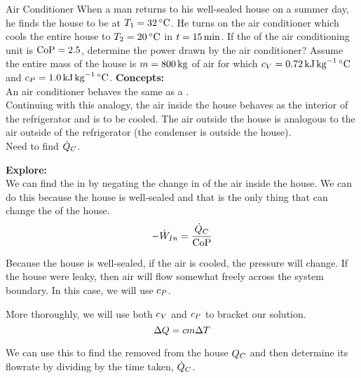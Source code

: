 \begin{example}{Air Conditioner}
  When a man returns to his well-sealed house on a summer day, he finds the house to be at $\Temp_{1} = \SI{32}{\degreeCelsius}$.
  He turns on the air conditioner which cools the entire house to $\Temp_{2} = \SI{20}{\degreeCelsius}$ in $t = \SI{15}{\minute}$.
  If the  of the air conditioning unit is $\text{CoP} = 2.5$, determine the power drawn by the air conditioner?
  Assume the entire mass of the house is $m = \SI{800}{\kilo\gram}$ of air for which $\SpecificHeatVolume = \SI{0.72}{\kilo\joule\per\kilo\gram\degreeCelsius}$ and $\SpecificHeatPressure = \SI{1.0}{\kilo\joule\per\kilo\gram\degreeCelsius}$.
  \tcblower{}
  \textbf{Concepts:} \\
  An air conditioner behaves the same as a . \\
  Continuing with this analogy, the air inside the house behaves as the interior of the refrigerator and is to be cooled.
  The air outside the house is analogous to the air outside of the refrigerator (the condenser is outside the house). \\
  Need to find $\dot{Q}_{C}$.

  \textbf{Explore:} \\
  We can find the  in by negating the change in  of the air inside the house.
  We can do this because the house is well-sealed and that is the only thing that can change the  of the house. \\
  \begin{equation*}
    -\dot{W}_{In} = \frac{\dot{Q}_{C}}{\text{CoP}}
  \end{equation*}

  Because the house is well-sealed, if the air is cooled, the pressure will change.
  If the house were leaky, then air will flow somewhat freely across the system boundary.
  In this case, we will use $c_{P}$.

  More thoroughly, we will use both $c_{V}$ and $c_{P}$ to bracket our solution.
  \begin{equation*}
    \Delta Q = c m \Delta T
  \end{equation*}

  We can use this to find the  removed from the house $Q_{C}$ and then determine its flowrate by dividing by the time taken, $\dot{Q}_{C}$.


\end{example}
